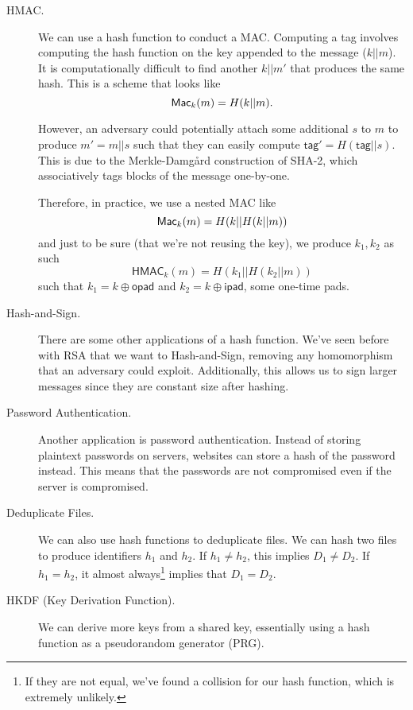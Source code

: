 \begin{description}
    \item[HMAC.] We can use a hash function to conduct a MAC. Computing a tag involves computing the hash function on the key appended to the message ($k||m$). It is computationally difficult to find another $k || m'$ that produces the same hash. This is a scheme that looks like
        \[\operatorname{\mathsf{Mac}}_k(m) = H(k||m).\]

        However, an adversary could potentially attach some additional $s$ to $m$ to produce $m' = m||s$ such that they can easily compute $\mathsf{tag}' = H(\mathsf{tag}||s)$. This is due to the Merkle-Damgård construction of SHA-2, which associatively tags blocks of the message one-by-one.


        Therefore, in practice, we use a nested MAC like
        \[\operatorname{\mathsf{Mac}}_k(m) = H(k||H(k||m))\]
        and just to be sure (that we're not reusing the key), we produce $k_1, k_2$ as such
        \[\mathsf{HMAC}_k(m) = H(k_1||H(k_2||m))\]
        such that $k_1 = k\oplus \mathsf{opad}$ and $k_2 = k\oplus\mathsf{ipad}$, some one-time pads.

    \item[Hash-and-Sign.] There are some other applications of a hash function. We've seen before with RSA that we want to Hash-and-Sign, removing any homomorphism that an adversary could exploit. Additionally, this allows us to sign larger messages since they are constant size after hashing.

    \item[Password Authentication.] Another application is password authentication. Instead of storing plaintext passwords on servers, websites can store a hash of the password instead. This means that the passwords are not compromised even if the server is compromised.

    \item[Deduplicate Files.] We can also use hash functions to deduplicate files. We can hash two files to produce identifiers $h_1$ and $h_2$. If $h_1\neq h_2$, this implies $D_1\neq D_2$. If $h_1 = h_2$, it almost always\footnote{If they are not equal, we've found a collision for our hash function, which is extremely unlikely.} implies that $D_1 = D_2$.

    \item[HKDF (Key Derivation Function).] We can derive more keys from a shared key, essentially using a hash function as a pseudorandom generator (PRG).


\end{description}
